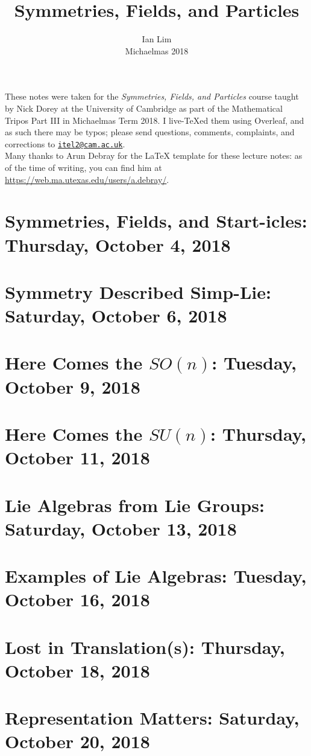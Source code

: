 \documentclass[reqno]{amsart}
\begin{document}
\title{Symmetries, Fields, and Particles}
\author{Ian Lim\\ Michaelmas 2018}
\maketitle
{\small\noindent These notes were taken for the \textit{Symmetries, Fields, and Particles} course taught by Nick Dorey at the University of Cambridge as part of the Mathematical Tripos Part III in Michaelmas Term 2018. I live-\TeX ed them using Overleaf, and as such there may be typos; please send questions, comments, complaints, and corrections to 
\href{mailto:itel2@cam.ac.uk?subject=SFP\%20Lecture\%20Notes}{\texttt{itel2@cam.ac.uk}}.\\
Many thanks to Arun Debray for the {\LaTeX} template for these lecture notes: as of the time of writing, you can find him at \url{https://web.ma.utexas.edu/users/a.debray/}.}

\tableofcontents

\section{Symmetries, Fields, and Start-icles: Thursday, October 4, 2018}
	
\section{Symmetry Described Simp-Lie: Saturday, October 6, 2018}
	
\section{Here Comes the $SO(n)$: Tuesday, October 9, 2018}
	
\section{Here Comes the $SU(n)$: Thursday, October 11, 2018}
	
\section{Lie Algebras from Lie Groups: Saturday, October 13, 2018}
	
\section{Examples of Lie Algebras: Tuesday, October 16, 2018}
	
\section{Lost in Translation(s): Thursday, October 18, 2018}
    
\section{Representation Matters: Saturday, October 20, 2018}
    
\end{document}

